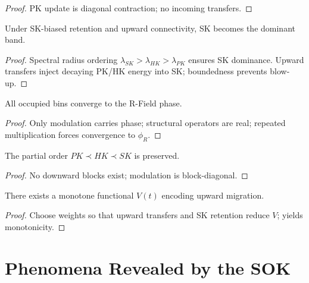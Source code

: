 \documentclass[11pt]{article}
\begin{document}
\begin{proof}
PK update is diagonal contraction; no incoming transfers.
\end{proof}

\begin{theorem}
Under SK-biased retention and upward connectivity, SK becomes the dominant band.
\end{theorem}

\begin{proof}
Spectral radius ordering $\lambda_{SK}>\lambda_{HK}>\lambda_{PK}$ ensures SK 
dominance. Upward transfers inject decaying PK/HK energy into SK; boundedness 
prevents blow-up.
\end{proof}

\begin{theorem}
All occupied bins converge to the R-Field phase.
\end{theorem}

\begin{proof}
Only modulation carries phase; structural operators are real; repeated 
multiplication forces convergence to $\phi_R$.
\end{proof}

\begin{theorem}
The partial order $PK\prec HK\prec SK$ is preserved.
\end{theorem}

\begin{proof}
No downward blocks exist; modulation is block-diagonal.
\end{proof}

\begin{theorem}
There exists a monotone functional $V(t)$ encoding upward migration.
\end{theorem}

\begin{proof}
Choose weights so that upward transfers and SK retention reduce $V$; yields 
monotonicity.
\end{proof}

\section{Phenomena Revealed by the SOK}
\end{document}
